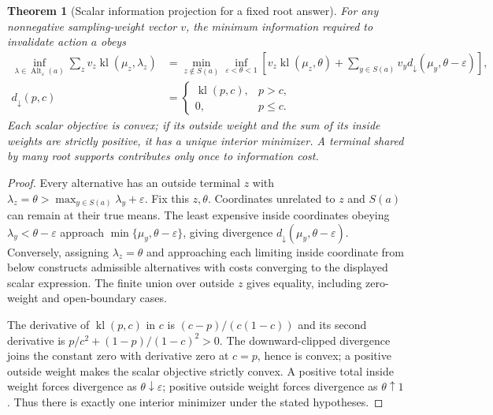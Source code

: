 \documentclass{article}
\theoremstyle{plain}
\newtheorem{theorem}{Theorem}[section]
\theoremstyle{definition}
\begin{document}
\begin{theorem}[Scalar information projection for a fixed root answer]\label{thm:active-kl-projection}
For any nonnegative sampling-weight vector $v$, the minimum information required to invalidate action $a$ obeys
\begin{align}
 \inf_{\lambda\in\operatorname{Alt}_\varepsilon(a)}
 \sum_z v_z\operatorname{kl}(\mu_z,\lambda_z)
 &=\min_{z\notin S(a)}\inf_{\varepsilon<\theta<1}
 \left[v_z\operatorname{kl}(\mu_z,\theta)
 +\sum_{y\in S(a)}v_y d_\downarrow(\mu_y,\theta-\varepsilon)\right],
 \label{eq:active-projection}\\[-4pt]
 d_\downarrow(p,c)&=\begin{cases}\operatorname{kl}(p,c),&p>c,\\0,&p\le c.\end{cases}\nonumber
\end{align}
Each scalar objective is convex; if its outside weight and the sum of its inside weights are strictly positive, it has a unique interior minimizer. A terminal shared by many root supports contributes only once to information cost.
\end{theorem}
\begin{proof}
Every alternative has an outside terminal $z$ with $\lambda_z=\theta>\max_{y\in S(a)}\lambda_y+\varepsilon$. Fix this $z,\theta$. Coordinates unrelated to $z$ and $S(a)$ can remain at their true means. The least expensive inside coordinates obeying $\lambda_y<\theta-\varepsilon$ approach $\min\{\mu_y,\theta-\varepsilon\}$, giving divergence $d_\downarrow(\mu_y,\theta-\varepsilon)$. Conversely, assigning $\lambda_z=\theta$ and approaching each limiting inside coordinate from below constructs admissible alternatives with costs converging to the displayed scalar expression. The finite union over outside $z$ gives equality, including zero-weight and open-boundary cases.

The derivative of $\operatorname{kl}(p,c)$ in $c$ is $(c-p)/(c(1-c))$ and its second derivative is $p/c^2+(1-p)/(1-c)^2>0$. The downward-clipped divergence joins the constant zero with derivative zero at $c=p$, hence is convex; a positive outside weight makes the scalar objective strictly convex. A positive total inside weight forces divergence as $\theta\downarrow\varepsilon$; positive outside weight forces divergence as $\theta\uparrow1$. Thus there is exactly one interior minimizer under the stated hypotheses.
\end{proof}
\end{document}
